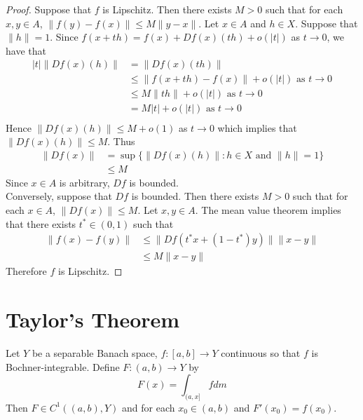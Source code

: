 \documentclass{book}
\begin{document}
	\begin{proof}
		Suppose that $f$ is Lipschitz. Then there exists $M > 0$ such that for each $x, y \in A$, $\|f(y) - f(x)\| \leq M \|y - x\|$. Let $x \in A$ and $h \in X$. Suppose that $\|h\| = 1$. Since $f(x+th) = f(x) + Df(x)(th) + o(|t|)$ as $t \rightarrow 0$, we have that 
		\begin{align*}
			|t|\|Df(x)(h)\| 
			& = \|Df(x)(th)\| \\
			& \leq \|f(x +th) - f(x)\| + o(|t|) \text{ as $t \rightarrow 0$} \\
			& \leq M \|th\|  + o(|t|)  \text{ as $t \rightarrow 0$}\\
			& = M |t|  + o(|t|)  \text{ as $t \rightarrow 0$}\\
		\end{align*}
		Hence $\|Df(x)(h)\| \leq M + o(1) $ as $t \rightarrow 0$ which implies that $\|Df(x)(h)\| \leq M $. Thus 
		\begin{align*}
			\|Df(x)\| 
			& = \sup \{\|Df(x)(h)\|: h \in X \text{ and $\|h\| =1 $}\} \\
			& \leq M
		\end{align*}
		Since $x \in A$ is arbitrary, $Df$ is bounded.\\
		Conversely, suppose that $Df$ is bounded. Then there exists $M > 0$ such that for each $x \in A$, $\|Df(x)\| \leq M$. Let $x,y \in A$. The mean value theorem implies that there exists $t^* \in (0,1)$ such that 
		\begin{align*}
			\|f(x) - f(y)\| 
			& \leq \|Df(t^*x + (1-t^*)y)\|\|x-y\| \\
			& \leq M \|x-y\|
		\end{align*}
		Therefore $f$ is Lipschitz.
	\end{proof}
	
	
	
	
	
	
	
	
	
	
	\newpage
	\section{Taylor's Theorem}
	
	\begin{ex} \lex{}
	Let $Y$ be a separable Banach space, $f:[a,b] \rightarrow Y$ continuous so that $f$ is Bochner-integrable. Define $F:(a,b) \rightarrow Y$ by  $$F(x) = \int_{(a, x]}f dm$$ Then $F \in C^1((a,b), Y)$ and for each $x_0 \in (a,b)$ and $F'(x_0) = f(x_0)$.
	\end{ex}
	
\end{document}
